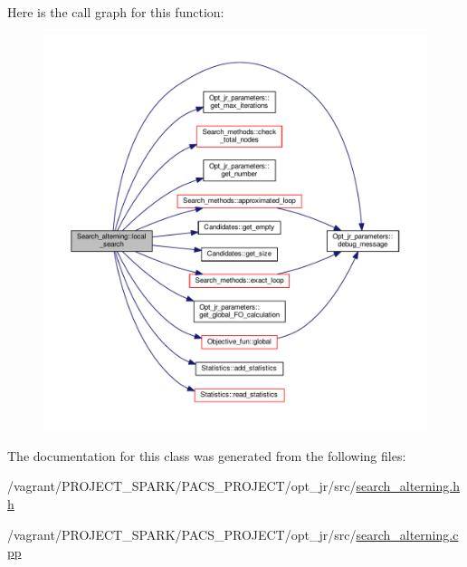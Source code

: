 Here is the call graph for this function\-:
\nopagebreak
\begin{figure}[H]
\begin{center}
\leavevmode
\includegraphics[width=350pt]{classSearch__alterning_a981af51221c3749c4c20e58b8a622cb1_cgraph}
\end{center}
\end{figure}




The documentation for this class was generated from the following files\-:\begin{DoxyCompactItemize}
\item 
/vagrant/\-P\-R\-O\-J\-E\-C\-T\-\_\-\-S\-P\-A\-R\-K/\-P\-A\-C\-S\-\_\-\-P\-R\-O\-J\-E\-C\-T/opt\-\_\-jr/src/\hyperlink{search__alterning_8hh}{search\-\_\-alterning.\-hh}\item 
/vagrant/\-P\-R\-O\-J\-E\-C\-T\-\_\-\-S\-P\-A\-R\-K/\-P\-A\-C\-S\-\_\-\-P\-R\-O\-J\-E\-C\-T/opt\-\_\-jr/src/\hyperlink{search__alterning_8cpp}{search\-\_\-alterning.\-cpp}\end{DoxyCompactItemize}
